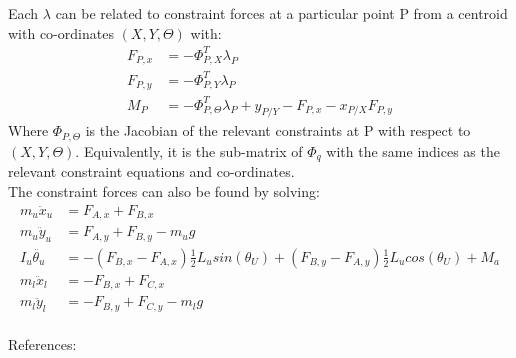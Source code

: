 Each $\lambda$ can be related to constraint forces at a particular point P from a centroid with co-ordinates $(X,Y,\Theta)$ with:
\begin{equation}
\begin{aligned}
F_{P,x}&=-\Phi_{P,X}^T\lambda_P \\
F_{P,y}&=-\Phi_{P,Y}^T\lambda_P \\
M_P    &=-\Phi_{P,\Theta}^T\lambda_P+y_{P/Y}-F_{P,x}-x_{P/X}F_{P,y}
\end{aligned}
\end{equation}
Where $\Phi_{P,\Theta}$ is the Jacobian of the relevant constraints at P with respect to $(X,Y,\Theta)$. Equivalently, it is the sub-matrix of $\Phi_q$ with the same indices as the relevant constraint equations and co-ordinates.\\

The constraint forces can also be found by solving:
\begin{equation}
\begin{aligned}
m_u \ddot{x}_u &= F_{A,x}+F_{B,x} \\ 
m_u \ddot{y}_u &= F_{A,y}+F_{B,y} -m_u g \\
I_u \ddot{\theta_u}&=-(F_{B,x}-F_{A,x})\tfrac{1}{2}L_usin(\theta_U)+(F_{B,y}-F_{A,y})\tfrac{1}{2}L_ucos(\theta_U)+M_a\\
m_l \ddot{x}_l &= -F_{B,x}+F_{C,x} \\ 
m_l \ddot{y}_l &= -F_{B,y}+F_{C,y} -m_l g\\
\end{aligned}
\end{equation}


References: \cite{Schilder2018} \cite{Hibbeler2013}

